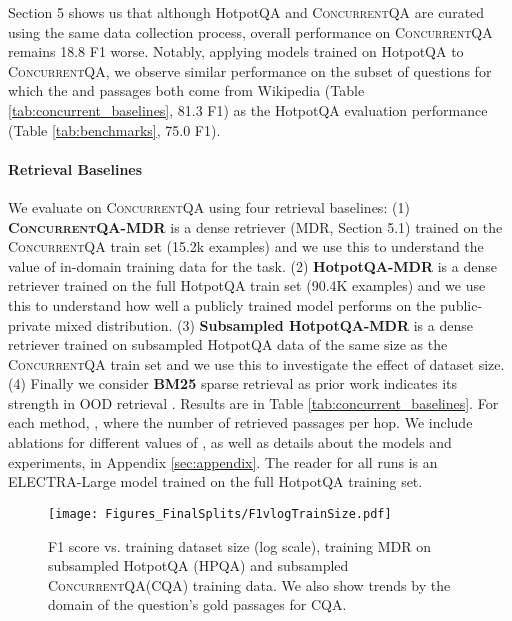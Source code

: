 \documentclass{article}
\renewcommand\cite{\citep}	\newcommand\shortcite{\citeyearpar}\newcommand\newcite{\citet}
\newcommand{\datasetname}{\textsc{ConcurrentQA}\xspace}
\begin{document}
Section 5 shows us that although HotpotQA and \datasetname are curated using the same data collection process, overall performance on \datasetname remains 18.8 F1 worse. Notably, applying models trained on HotpotQA to \datasetname, we observe similar performance on the subset of questions for which the  and  passages both come from Wikipedia (Table \ref{tab:concurrent_baselines}, 81.3 F1) as the HotpotQA evaluation performance (Table \ref{tab:benchmarks}, 75.0 F1).

\paragraph{Retrieval Baselines} We evaluate on \datasetname using four retrieval baselines: (1) \textbf{\datasetname-MDR} is a dense retriever (MDR, Section 5.1) trained on the \datasetname train set (15.2k examples) and we use this to understand the value of in-domain training data for the task. (2) \textbf{HotpotQA-MDR} is a dense retriever trained on the full HotpotQA train set (90.4K examples) and we use this to understand how well a publicly trained model performs on the public-private mixed distribution. (3) \textbf{Subsampled HotpotQA-MDR} is a dense retriever trained on subsampled HotpotQA data of the same size as the \datasetname train set and we use this to investigate the effect of dataset size. (4) Finally we consider \textbf{BM25} sparse retrieval as prior work indicates its strength in OOD retrieval \cite{thakur2021beir}. Results are in Table \ref{tab:concurrent_baselines}. For each method, , where  the number of retrieved passages per hop. We include ablations for different values of , as well as details about the models and experiments, in Appendix \ref{sec:appendix}. The reader for all runs is an ELECTRA-Large model trained on the full HotpotQA training set. 


\begin{figure}[t!]
    \centering
    \texttt{[image: Figures\_FinalSplits/F1vlogTrainSize.pdf]}
    \caption[width=\linewidth]{F1 score vs. training dataset size (log scale), training MDR on subsampled HotpotQA (HPQA) and subsampled \datasetname (CQA) training data. We also show trends by the domain of the question's gold passages for CQA.}
    \label{fig:train_size}
    \vspace{-2mm}
\end{figure}
\end{document}
